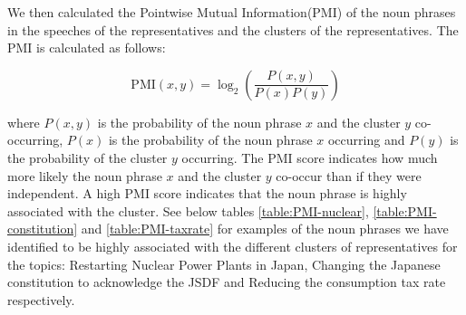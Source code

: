 \documentclass[final,5p,times,twocolumn,authoryear]{elsarticle}
\begin{document}
We then calculated the Pointwise Mutual Information(PMI)\citep{church-hanks-1990-word} of the noun phrases in the speeches of the representatives and the clusters of the representatives. The PMI is calculated as follows:
\begin{center}
	\[	\mathrm{PMI}(x,y) = \log_2 \left( \frac{P(x,y)}{P(x)P(y)} \right) \]
\end{center}

where $P(x,y)$ is the probability of the noun phrase $x$ and the cluster $y$ co-occurring, $P(x)$ is the probability of the noun phrase $x$ occurring and $P(y)$ is the probability of the cluster $y$ occurring. The PMI score indicates how much more likely the noun phrase $x$ and the cluster $y$ co-occur than if they were independent. A high PMI score indicates that the noun phrase is highly associated with the cluster. See below tables \ref{table:PMI-nuclear}, \ref{table:PMI-constitution} and \ref{table:PMI-taxrate} for examples of the noun phrases we have identified to be highly associated with the different clusters of representatives for the topics: Restarting Nuclear Power Plants in Japan, Changing the Japanese constitution to acknowledge the JSDF and Reducing the consumption tax rate respectively.
\end{document}
